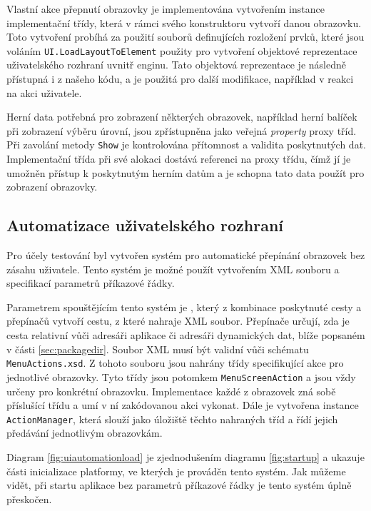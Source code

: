 Vlastní akce přepnutí obrazovky je implementována vytvořením instance implementační třídy, která v rámci svého konstruktoru vytvoří danou obrazovku. Toto vytvoření probíhá za použití souborů definujících rozložení prvků, které jsou voláním \texttt{UI.LoadLayoutToElement} použity pro vytvoření objektové reprezentace uživatelského rozhraní uvnitř enginu. Tato objektová reprezentace je následně přístupná i z našeho kódu, a je použitá pro další modifikace, například v reakci na akci uživatele.

Herní data potřebná pro zobrazení některých obrazovek, například herní balíček při zobrazení výběru úrovní, jsou zpřístupněna jako veřejná \textit{property} proxy tříd. Při zavolání metody \texttt{Show} je kontrolována přítomnost a validita poskytnutých dat. Implementační třída při své alokaci dostává referenci na proxy třídu, čímž jí je umožněn přístup k poskytnutým herním datům a je schopna tato data použít pro zobrazení obrazovky.

\subsection{Automatizace uživatelského rozhraní}

Pro účely testování byl vytvořen systém pro automatické přepínání obrazovek bez zásahu uživatele. Tento systém je možné použít vytvořením XML souboru a specifikací parametrů příkazové řádky.

Parametrem spouštějícím tento systém je , který z kombinace poskytnuté cesty a přepínačů  vytvoří cestu, z které nahraje XML soubor. Přepínače  určují, zda je cesta  relativní vůči adresáři aplikace či adresáři dynamických dat, blíže popsaném v části \ref{sec:packagedir}. Soubor XML musí být validní vůči schématu \texttt{MenuActions.xsd}. Z tohoto souboru jsou  nahrány třídy specifikující akce pro jednotlivé obrazovky. Tyto třídy jsou potomkem \texttt{MenuScreenAction} a jsou vždy určeny pro konkrétní obrazovku. Implementace každé z obrazovek zná sobě příslušící třídu a umí v ní zakódovanou akci vykonat. Dále je vytvořena instance \texttt{ActionManager}, která slouží jako úložiště těchto nahraných tříd a řídí jejich předávání jednotlivým obrazovkám.

Diagram \ref{fig:uiautomationload} je zjednodušením diagramu \ref{fig:startup} a ukazuje části inicializace platformy, ve kterých je prováděn tento systém. Jak můžeme vidět, při startu aplikace bez parametrů příkazové řádky je tento systém úplně přeskočen. 

